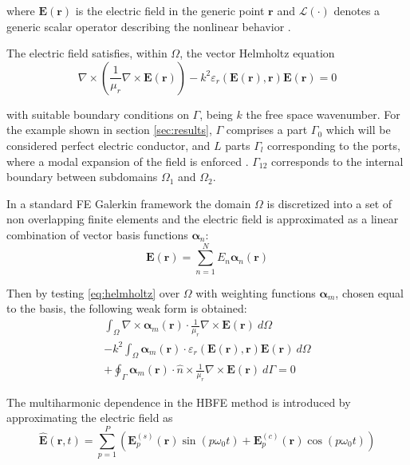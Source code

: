 \documentclass[journal]{IEEEtran}
\renewcommand{\vec}[1]{\mathbf{#1}}
\begin{document}
\noindent where $\vec{E}(\vec{r})$ is the electric field in the generic point
$\vec{r}$ and $\mathcal{L}(\cdot)$ denotes a generic scalar operator describing the
nonlinear behavior \cite{Guarnieri2010}. 

The electric field satisfies, within $\Omega$, the vector Helmholtz equation
%
\begin{equation}
\label{eq:helmholtz}
\nabla \times \left ( \frac{1}{\mu_r} \nabla \times \vec{E}(\vec{r}) \right )  - {k}^2 
\varepsilon_r \left(\vec{E}(\vec{r}), \vec{r} \right) \vec{E}(\vec{r}) = 0
\end{equation} 

\noindent with suitable boundary conditions on $\Gamma$, being $k$ the free
space wavenumber. For the example shown in section \ref{sec:results}, $\Gamma$
comprises a part $\Gamma_0$ which will be considered perfect electric conductor, and $L$ parts $\Gamma_l$
corresponding to the ports, where a modal expansion of the field is enforced \cite{Pelosi2009}. 
$\Gamma_{12}$ corresponds to the internal boundary between subdomains $\Omega_1$ and $\Omega_2$.

In a standard FE Galerkin framework the domain $\Omega$ is
discretized into a set of non overlapping finite elements and the electric
field is approximated as a linear combination of vector basis functions $\boldsymbol{\alpha}_n$:
%
\begin{equation}\label{e:femexpansion}
\vec{E}(\vec{r})  = \sum_{n=1}^N E_n \boldsymbol{\alpha}_n(\vec{r})
\end{equation} 

Then by testing \eqref{eq:helmholtz} over $\Omega$ with weighting functions
 $\boldsymbol{\alpha}_m$, chosen equal to the basis, the following weak form is
 obtained:
%
\begin{multline}\label{eq:fem}
\int_\Omega \nabla \times \boldsymbol{\alpha}_m (\vec{r}) \cdot \frac{1}{\mu_r}
\nabla \times \vec{E}(\vec{r}) \ d\Omega \\
- k^2 \int_\Omega  \boldsymbol{\alpha}_m (\vec{r}) \cdot \varepsilon_r 
(\vec{E}(\vec{r}), \vec{r}) \vec{E}(\vec{r}) \ d\Omega \\
+ \oint_{\Gamma} \boldsymbol{\alpha}_m (\vec{r}) \cdot \hat{n} \times \frac{1}{\mu_r} 
\nabla \times \vec{E}(\vec{r}) \ d\Gamma = 0
\end{multline} 


The multiharmonic dependence in the HBFE method is introduced by approximating
the electric field as \cite{Bachinger2005}
%
\begin{equation} \label{eq:field}
\vec{\hat{E}}(\vec{r}, t) = \sum^P_{p=1} \left( \vec{E}_{p}^{(s)}(\vec{r}) \sin(p
\omega_0 t) + \vec{E}_p^{(c)}(\vec{r}) \cos(p \omega_0 t) \right)
\end{equation} 
\end{document}
